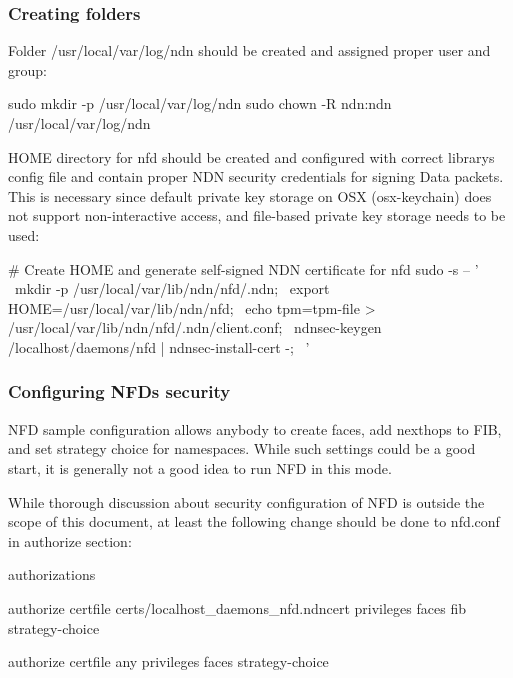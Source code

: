 \subsubsection*{Creating folders}

Folder {\ttfamily /usr/local/var/log/ndn} should be created and assigned proper user and group\+: \begin{DoxyVerb}sudo mkdir -p /usr/local/var/log/ndn
sudo chown -R ndn:ndn /usr/local/var/log/ndn
\end{DoxyVerb}


{\ttfamily H\+O\+ME} directory for {\ttfamily nfd} should be created and configured with correct library\textquotesingle{}s config file and contain proper N\+DN security credentials for signing Data packets. This is necessary since default private key storage on O\+SX ({\ttfamily osx-\/keychain}) does not support non-\/interactive access, and file-\/based private key storage needs to be used\+: \begin{DoxyVerb}# Create HOME and generate self-signed NDN certificate for nfd
sudo -s -- ' \
  mkdir -p /usr/local/var/lib/ndn/nfd/.ndn; \
  export HOME=/usr/local/var/lib/ndn/nfd; \
  echo tpm=tpm-file > /usr/local/var/lib/ndn/nfd/.ndn/client.conf; \
  ndnsec-keygen /localhost/daemons/nfd | ndnsec-install-cert -; \
'
\end{DoxyVerb}


\subsubsection*{Configuring N\+FD\textquotesingle{}s security}

N\+FD sample configuration allows anybody to create faces, add nexthops to F\+IB, and set strategy choice for namespaces. While such settings could be a good start, it is generally not a good idea to run N\+FD in this mode.

While thorough discussion about security configuration of N\+FD is outside the scope of this document, at least the following change should be done to nfd.\+conf in authorize section\+: \begin{DoxyVerb}authorizations
{
  authorize
  {
    certfile certs/localhost_daemons_nfd.ndncert
    privileges
    {
        faces
        fib
        strategy-choice
    }
  }

  authorize
  {
    certfile any
    privileges
    {
        faces
        strategy-choice
    }
  }
}
\end{DoxyVerb}


